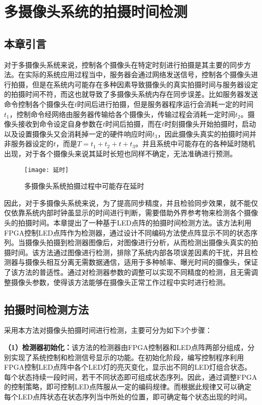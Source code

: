 \chapter{多摄像头系统的拍摄时间检测}

\section{本章引言}

对于多摄像头系统来说，控制各个摄像头在特定时刻进行拍摄是其主要的同步方法。在实际的系统应用过程当中，服务器会通过网络发送信号，控制各个摄像头进行拍摄，但是在系统内可能存在多种因素导致摄像头的真实拍摄时间与服务器设定的拍摄时间不符，而这也就导致了多摄像头系统内存在同步误差。比如服务器发送命令控制各个摄像头在$t$时间后进行拍摄，但是服务器程序运行会消耗一定的时间$t_1$，控制命令经网络由服务器传输给各个摄像头，传输过程会消耗一定时间$t_2$。摄像头接收到命令设定自身参数在$t$时间后拍摄，而在$t$时刻摄像头开始拍摄时，启动以及设置摄像头又会消耗掉一定的硬件响应时间$t_3$，因此摄像头真实的拍摄时间并非服务器设定的$t$，而是$T = t_1 + t_2 + t + t_3$。并且系统中可能存在的各种延时随机出现，对于各个摄像头来说其延时长短也同样不确定，无法准确进行预测。

\begin{figure}[h] 
  \centering
  \texttt{[image: 延时]}
  \caption{多摄像头系统拍摄过程中可能存在延时}
\end{figure}

因此，对于多摄像头系统来说，为了提高同步精度，并且检验同步效果，就不能仅仅依靠系统内部时钟虽显示的时间进行判断，需要借助外界参考物来检测各个摄像头的拍摄时间。本章提出了一种基于LED点阵的拍摄时间检测方法。该方法利用FPGA控制LED点阵作为检测器，通过设计不同编码方法使点阵显示不同的状态序列。当摄像头拍摄到检测器图像后，对图像进行分析，从而检测出摄像头真实的拍摄时间。该方法通过图像进行检测，排除了系统内部各项误差因素的干扰，并且检测器与摄像头相互分离无需数据通信，适用于多种帧率、曝光时间的摄像头，保证了该方法的普适性。通过对检测器参数的调整可以实现不同精度的检测，且无需调整摄像头参数，使得该方法能够在摄像头正常工作过程中实时进行检测。

\section{拍摄时间检测方法}

采用本方法对摄像头拍摄时间进行检测，主要可分为如下3个步骤：

\textbf{（1）检测器初始化：}该方法的检测器由FPGA控制器和LED点阵两部分组成，分别实现了系统控制和检测信号显示的功能。在初始化阶段，编写控制程序利用FPGA控制LED点阵中各个LED灯的亮灭变化，显示出不同的LED灯组合状态。每个状态持续一段时间，若干不同状态即可组成状态序列。因此，通过调整FPGA的控制策略，即可控制LED点阵服从一定的编码规律。而根据此规律又可以确定每个LED点阵状态在状态序列当中所处的位置，即可确定每个状态出现的时间。

